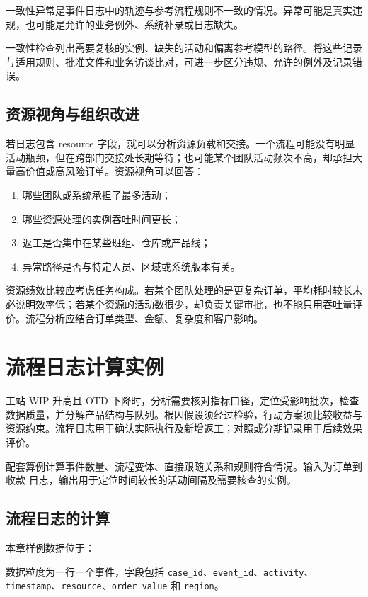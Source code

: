 \begin{definition}[一致性异常]
一致性异常是事件日志中的轨迹与参考流程规则不一致的情况。异常可能是真实违规，也可能是允许的业务例外、系统补录或日志缺失。
\end{definition}

一致性检查列出需要复核的实例、缺失的活动和偏离参考模型的路径。将这些记录与适用规则、批准文件和业务访谈比对，可进一步区分违规、允许的例外及记录错误。

\subsection{资源视角与组织改进}

若日志包含 resource 字段，就可以分析资源负载和交接。一个流程可能没有明显活动瓶颈，但在跨部门交接处长期等待；也可能某个团队活动频次不高，却承担大量高价值或高风险订单。资源视角可以回答：
\begin{enumerate}
  \item 哪些团队或系统承担了最多活动；
  \item 哪些资源处理的实例吞吐时间更长；
  \item 返工是否集中在某些班组、仓库或产品线；
  \item 异常路径是否与特定人员、区域或系统版本有关。
\end{enumerate}

资源绩效比较应考虑任务构成。若某个团队处理的是更复杂订单，平均耗时较长未必说明效率低；若某个资源的活动数很少，却负责关键审批，也不能只用吞吐量评价。流程分析应结合订单类型、金额、复杂度和客户影响。

\section{流程日志计算实例}

工站 WIP 升高且 OTD 下降时，分析需要核对指标口径，定位受影响批次，检查数据质量，并分解产品结构与队列。根因假设须经过检验，行动方案须比较收益与资源约束。流程日志用于确认实际执行及新增返工；对照或分期记录用于后续效果评价。

配套算例计算事件数量、流程变体、直接跟随关系和规则符合情况。输入为订单到收款
日志，输出用于定位时间较长的活动间隔及需要核查的实例。

\subsection{流程日志的计算}

本章样例数据位于：
\begin{center}
\end{center}
数据粒度为一行一个事件，字段包括 \texttt{case\_id}、\texttt{event\_id}、\texttt{activity}、\texttt{timestamp}、\texttt{resource}、\texttt{order\_value} 和 \texttt{region}。


